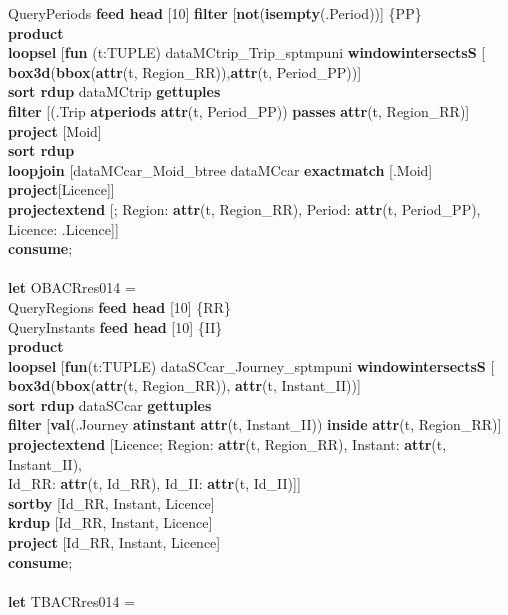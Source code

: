 \documentclass[a4paper]{article}
\newcommand{\op}[1]{\textbf{#1}}
\begin{document}
\begin{scriptsize}
\begin{tabbing}
\>QueryPeriods \op{feed head} [10] \op{filter} [\op{not}(\op{isempty}(.Period))] \{PP\}\\
\>\op{product}\\
\>\op{loopsel} [\op{fun} (t:TUPLE) dataMCtrip\_Trip\_sptmpuni \op{windowintersectsS} [\\
\>\>\>\>\op{box3d}(\op{bbox}(\op{attr}(t, Region\_RR)),\op{attr}(t, Period\_PP))]\\
\>\>\op{sort rdup} dataMCtrip \op{gettuples}\\
\>\>\op{filter} [(.Trip \op{atperiods} \op{attr}(t, Period\_PP)) \op{passes} \op{attr}(t, Region\_RR)]\\
\>\>\op{project} [Moid]\\
\>\>\op{sort rdup}\\
\>\>\op{loopjoin} [dataMCcar\_Moid\_btree dataMCcar \op{exactmatch} [.Moid] \op{project}[Licence]]\\
\>\>\op{projectextend} [; Region: \op{attr}(t, Region\_RR), Period: \op{attr}(t, Period\_PP), Licence: .Licence]]\\
\op{consume};\\
\\
\op{let} OBACRres014 =\\
\>QueryRegions  \op{feed head} [10] \{RR\}\\
\>QueryInstants \op{feed head} [10] \{II\}\\
\>\op{product}\\
\>\op{loopsel} [\op{fun}(t:TUPLE) dataSCcar\_Journey\_sptmpuni \op{windowintersectsS} [\\
\>\>\>\>\op{box3d}(\op{bbox}(\op{attr}(t, Region\_RR)), \op{attr}(t, Instant\_II))]\\
\>\>\op{sort rdup} dataSCcar  \op{gettuples}\\
\>\>\op{filter} [\op{val}(.Journey \op{atinstant} \op{attr}(t, Instant\_II)) \op{inside} \op{attr}(t, Region\_RR)]\\
\>\>\op{projectextend} [Licence; Region: \op{attr}(t, Region\_RR), Instant: \op{attr}(t, Instant\_II),\\
\>\>\>\>Id\_RR: \op{attr}(t, Id\_RR), Id\_II: \op{attr}(t, Id\_II)]]\\
\>\op{sortby} [Id\_RR, Instant, Licence]\\
\>\op{krdup} [Id\_RR, Instant, Licence]\\
\>\op{project} [Id\_RR, Instant, Licence]\\
\op{consume};\\
\\
\op{let} TBACRres014 =\\

\end{tabbing}
\end{scriptsize}
\end{document}
